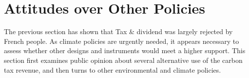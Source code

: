 \documentclass[english,5p,authoryear]{elsarticle}
\begin{document}




\section{Attitudes over Other Policies}\label{sec:attitudes_other_policies}

The previous section has shown that Tax \& dividend was largely rejected by French people. As climate policies are urgently needed, it appears necessary to assess whether other designs and instruments would meet a higher support. This section first examines public opinion about several alternative use of the carbon tax revenue, and then turns to other environmental and climate policies.
\end{document}
